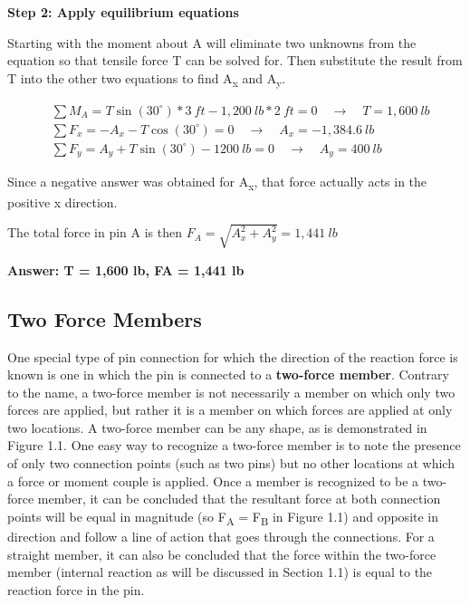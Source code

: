 \documentclass[
  letterpaper,
  DIV=11,
  numbers=noendperiod]{scrreprt}
\theoremstyle{definition}
\theoremstyle{remark}
\begin{document}
\begin{tcolorbox}
\begin{tcolorbox}
\textbf{Step 2: Apply equilibrium equations}

Starting with the moment about A will eliminate two unknowns from the
equation so that tensile force T can be solved for. Then substitute the
result from T into the other two equations to find A\textsubscript{x}
and A\textsubscript{y}.

\[
\begin{aligned}
& \sum M_A=T \sin (30^{\circ}) * 3{~ft}-1,200{~lb }*2{~ft}=0 \quad\rightarrow\quad T=1,600 {~lb} \\
& \sum F_x=-A_x-T \cos (30^{\circ})=0 \quad\rightarrow\quad A_x=-1,384.6{~lb} \\
& \sum F_y=A_y+T \sin (30^{\circ})-1200{~lb}=0 \quad\rightarrow\quad A_y= 400{~lb}
\end{aligned}
\]

Since a negative answer was obtained for A\textsubscript{x}, that force
actually acts in the positive x direction.

The total force in pin A is then \(F_A=\sqrt{A_x^2+A_y^2}=1,441{~lb}\)

\textbf{Answer: T = 1,600 lb, FA = 1,441 lb}

\end{tcolorbox}

\end{tcolorbox}

\subsection{Two Force Members}\label{two-force-members}

One special type of pin connection for which the direction of the
reaction force is known is one in which the pin is connected to a
\textbf{two-force member}. Contrary to the name, a two-force member is
not necessarily a member on which only two forces are applied, but
rather it is a member on which forces are applied at only two locations.
A two-force member can be any shape, as is demonstrated in Figure 1.1.
One easy way to recognize a two-force member is to note the presence of
only two connection points (such as two pins) but no other locations at
which a force or moment couple is applied. Once a member is recognized
to be a two-force member, it can be concluded that the resultant force
at both connection points will be equal in magnitude (so
F\textsubscript{A} = F\textsubscript{B} in Figure 1.1) and opposite in
direction and follow a line of action that goes through the connections.
For a straight member, it can also be concluded that the force within
the two-force member (internal reaction as will be discussed in Section
1.1) is equal to the reaction force in the pin.
\end{document}
